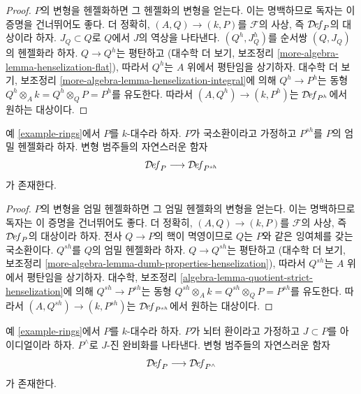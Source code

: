\begin{proof}
$P$의 변형을 헨젤화하면 그 헨젤화의 변형을 얻는다. 이는 명백하므로
독자는 이 증명을 건너뛰어도 좋다. 더 정확히, $(A, Q) \to (k, P)$를
$\mathcal{F}$의 사상, 즉 $\mathcal{D}\!\mathit{ef}_P$의 대상이라 하자.
$J_Q \subset Q$로 $Q$에서 $J$의 역상을 나타낸다. $(Q^h, J_Q^h)$를
순서쌍 $(Q, J_Q)$의 헨젤화라 하자. $Q \to Q^h$는 평탄하고
(대수학 더 보기, 보조정리 \ref{more-algebra-lemma-henselization-flat}),
따라서 $Q^h$는 $A$ 위에서 평탄임을 상기하자. 대수학 더 보기,
보조정리 \ref{more-algebra-lemma-henselization-integral}에 의해
$Q^h \to P^h$는 동형 $Q^h \otimes_A k = Q^h \otimes_Q P = P^h$를
유도한다. 따라서 $(A, Q^h) \to (k, P^h)$는
$\mathcal{D}\!\mathit{ef}_{P^h}$에서 원하는 대상이다.
\end{proof}

\begin{lemma}
\label{lemma-strict-henselization}
예 \ref{example-rings}에서 $P$를 $k$-대수라 하자. $P$가 국소환이라고
가정하고 $P^{sh}$를 $P$의 엄밀 헨젤화라 하자. 변형 범주들의 자연스러운 함자
$$
\mathcal{D}\!\mathit{ef}_P \longrightarrow \mathcal{D}\!\mathit{ef}_{P^{sh}}
$$
가 존재한다.
\end{lemma}

\begin{proof}
$P$의 변형을 엄밀 헨젤화하면 그 엄밀 헨젤화의 변형을 얻는다. 이는
명백하므로 독자는 이 증명을 건너뛰어도 좋다. 더 정확히,
$(A, Q) \to (k, P)$를 $\mathcal{F}$의 사상, 즉
$\mathcal{D}\!\mathit{ef}_P$의 대상이라 하자. 전사 $Q \to P$의 핵이
멱영이므로 $Q$는 $P$와 같은 잉여체를 갖는 국소환이다. $Q^{sh}$를
$Q$의 엄밀 헨젤화라 하자. $Q \to Q^{sh}$는 평탄하고
(대수학 더 보기, 보조정리
\ref{more-algebra-lemma-dumb-properties-henselization}), 따라서 $Q^{sh}$는
$A$ 위에서 평탄임을 상기하자. 대수학, 보조정리
\ref{algebra-lemma-quotient-strict-henselization}에 의해
$Q^{sh} \to P^{sh}$는 동형
$Q^{sh} \otimes_A k = Q^{sh} \otimes_Q P = P^{sh}$를 유도한다. 따라서
$(A, Q^{sh}) \to (k, P^{sh})$는 $\mathcal{D}\!\mathit{ef}_{P^{sh}}$에서
원하는 대상이다.
\end{proof}

\begin{lemma}
\label{lemma-completion}
예 \ref{example-rings}에서 $P$를 $k$-대수라 하자. $P$가 뇌터 환이라고
가정하고 $J \subset P$를 아이디얼이라 하자.%
$P^\wedge$로 $J$-진 완비화를 나타낸다. 변형 범주들의 자연스러운 함자
$$
\mathcal{D}\!\mathit{ef}_P \longrightarrow \mathcal{D}\!\mathit{ef}_{P^\wedge}
$$
가 존재한다.
\end{lemma}

